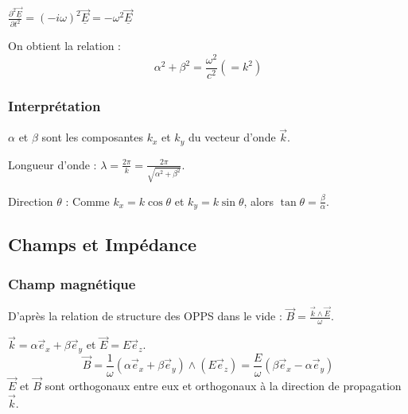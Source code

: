 \documentclass[french]{yLectureNote}
\renewcommand{\vec}{\overrightarrow}
\begin{document}
$\frac{\partial^2 \underline{\vec{E}}}{\partial t^2} = (-i\omega)^2 \underline{\vec{E}} = -\omega^2 \underline{\vec{E}}$

On obtient la relation : 
$$\alpha^2 + \beta^2 = \frac{\omega^2}{c^2} (= k^2)$$

\subsubsection{Interprétation}
$\alpha$ et $\beta$ sont les composantes $k_x$ et $k_y$ du vecteur d'onde $\vec{k}$.

Longueur d'onde : $\lambda = \frac{2\pi}{k} = \frac{2\pi}{\sqrt{\alpha^2 + \beta^2}}$.

Direction $\theta$ : Comme $k_x = k \cos\theta$ et $k_y = k \sin\theta$, alors $\tan\theta = \frac{\beta}{\alpha}$.

\subsection{Champs et Impédance}

\subsubsection{Champ magnétique}
D'après la relation de structure des OPPS dans le vide : $\vec{B} = \frac{\vec{k} \wedge \vec{E}}{\omega}$.

$\vec{k} = \alpha \vec{e}_x + \beta \vec{e}_y$ et $\vec{E} = E \vec{e}_z$.
$$\vec{B} = \frac{1}{\omega} (\alpha \vec{e}_x + \beta \vec{e}_y) \wedge (E \vec{e}_z) = \frac{E}{\omega} (\beta \vec{e}_x - \alpha \vec{e}_y)$$
$\vec{E}$ et $\vec{B}$ sont orthogonaux entre eux et orthogonaux à la direction de propagation $\vec{k}$.


\end{document}
